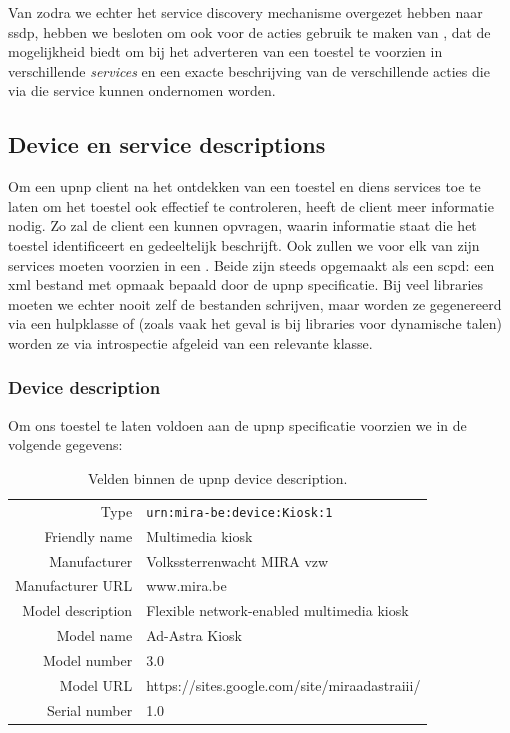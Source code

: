 Van zodra we echter het service discovery mechanisme overgezet hebben naar \ac{ssdp}, hebben we besloten om ook voor de acties gebruik te maken van , dat de mogelijkheid biedt om bij het adverteren van een toestel te voorzien in verschillende \emph{services} en een exacte beschrijving van de verschillende acties die via die service kunnen ondernomen worden.

\subsection{Device en service descriptions}

Om een \ac{upnp} client na het ontdekken van een toestel en diens services toe te laten om het toestel ook effectief te controleren, heeft de client meer informatie nodig. Zo zal de client een  kunnen opvragen, waarin informatie staat die het toestel identificeert en gedeeltelijk beschrijft. Ook zullen we voor elk van zijn services moeten voorzien in een . Beide zijn steeds opgemaakt als een \ac{scpd}: een \ac{xml} bestand met opmaak bepaald door de \ac{upnp} specificatie. Bij veel libraries moeten we echter nooit zelf de bestanden schrijven, maar worden ze gegenereerd via een hulpklasse of (zoals vaak het geval is bij libraries voor dynamische talen) worden ze via introspectie afgeleid van een relevante klasse.

\subsubsection{Device description}

Om ons toestel te laten voldoen aan de \ac{upnp} specificatie voorzien we in de volgende gegevens:

\begin{table}[h!]
  \begin{center}
    \begin{tabular}{r l}
    \hline
    Type & \texttt{urn:mira-be:device:Kiosk:1} \\
    Friendly name & Multimedia kiosk \\
    Manufacturer & Volkssterrenwacht MIRA vzw \\
    Manufacturer URL & www.mira.be \\
    Model description & Flexible network-enabled multimedia kiosk \\
    Model name & Ad-Astra Kiosk \\
    Model number & 3.0 \\
    Model URL & https://sites.google.com/site/miraadastraiii/ \\
    Serial number & 1.0 \\
    \hline
    \end{tabular}
  \end{center}
  \caption{Velden binnen de \ac{upnp} device description.}
\end{table}

